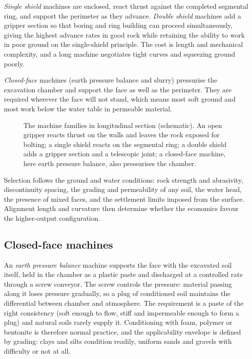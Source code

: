 \emph{Single shield} machines are enclosed, react thrust against the completed
segmental ring, and support the perimeter as they advance. \emph{Double
shield} machines add a gripper section so that boring and ring building can
proceed simultaneously, giving the highest advance rates in good rock while
retaining the ability to work in poor ground on the single-shield principle.
The cost is length and mechanical complexity, and a long machine negotiates
tight curves and squeezing ground poorly.

\emph{Closed-face} machines (earth pressure balance and slurry)
pressurise the excavation chamber and support the face as well as the
perimeter. They are required wherever the face will not stand, which
means most soft ground and most work below the water table in
permeable material.

\begin{figure}[htbp]
\centering
{}
\caption{The machine families in longitudinal section (schematic). An open gripper reacts thrust on the walls and leaves the rock exposed for bolting; a single shield reacts on the segmental ring; a double shield adds a gripper section and a telescopic joint; a closed-face machine, here earth pressure balance, also pressurises the chamber.}
\label{fig:tbm-families}
\end{figure}

Selection follows the ground and water conditions: rock strength
and abrasivity, discontinuity spacing, the grading and permeability of any
soil, the water head, the presence of mixed faces, and the settlement limits
imposed from the surface. Alignment length and curvature then determine
whether the economics favour the higher-output configuration.

\subsection{Closed-face machines}
\label{sec:closed-face}

An \emph{earth pressure balance} machine supports the face with the excavated
soil itself, held in the chamber as a plastic paste and discharged at a
controlled rate through a screw conveyor. The screw controls the pressure:
material passing along it loses pressure gradually, so a plug of conditioned
soil maintains the differential between chamber and atmosphere. The
requirement is a paste of the right consistency (soft enough to flow,
stiff and impermeable enough to form a plug) and natural soils rarely
supply it. Conditioning with foam, polymer or bentonite is therefore normal
practice, and the applicability envelope is defined by grading:
clays and silts condition readily, uniform sands and gravels with difficulty
or not at all.

